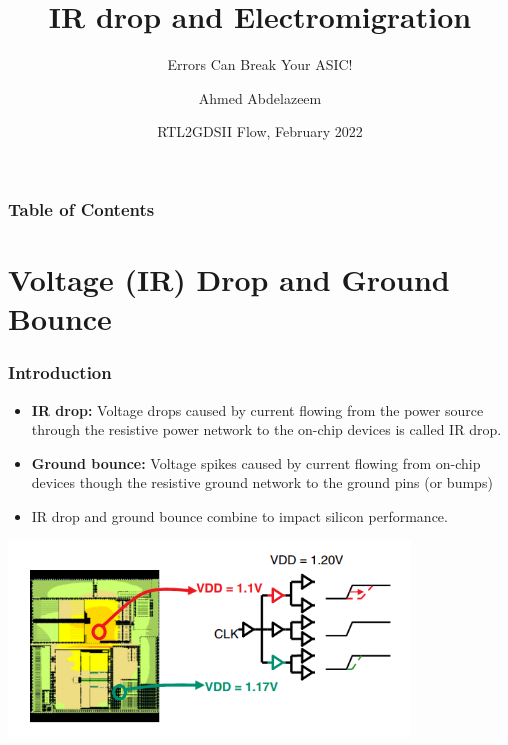 \documentclass{beamer}
\title[EMIR ] %
{IR drop and Electromigration}
\subtitle{Errors Can Break Your ASIC!}
\author[Ahmed Abdelazeem] %
{Ahmed Abdelazeem}
\institute[ZU] %
{
	Faculty of Engineering\\
	Zagazig University
}
\date[ZU 2023] %
{RTL2GDSII Flow, February 2022}
\begin{document}
	
	\frame{\titlepage}
	
	
	\begin{frame}
		\frametitle{Table of Contents}
		\tableofcontents
	\end{frame}
	
	
	\section{Voltage (IR) Drop and Ground Bounce}
	
	\begin{frame}
		\frametitle{Introduction}
		\begin{itemize}
			\item \textbf{IR drop:} Voltage drops caused by current flowing from the power source through the
			resistive power network to the on-chip devices is called IR drop.
			\item \textbf{Ground bounce:} Voltage spikes caused by current flowing from on-chip devices though the
			resistive ground network to the ground pins (or bumps)
			\item IR drop and ground bounce combine to impact silicon performance.
			
		\end{itemize}
		\begin{center}
		\includegraphics[width=0.8\textwidth]{IR1} 
		\end{center}
		


	\end{frame}
	
	
\end{document}
